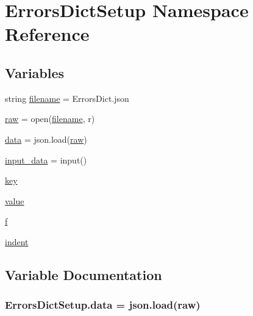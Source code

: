 \hypertarget{namespace_errors_dict_setup}{}\section{Errors\+Dict\+Setup Namespace Reference}
\label{namespace_errors_dict_setup}
\subsection*{Variables}
\begin{DoxyCompactItemize}
\item 
string \hyperlink{namespace_errors_dict_setup_a0c97c48fca0fdec3e730b9df1dbab9c7}{filename} = \textquotesingle{}Errors\+Dict.\+json\textquotesingle{}
\item 
\hyperlink{namespace_errors_dict_setup_a71f324cc110ab41d2a588f590fff7481}{raw} = open(\hyperlink{namespace_errors_dict_setup_a0c97c48fca0fdec3e730b9df1dbab9c7}{filename}, \textquotesingle{}r\textquotesingle{})
\item 
\hyperlink{namespace_errors_dict_setup_af570460846fb9f0c91abd308a095dcdc}{data} = json.\+load(\hyperlink{namespace_errors_dict_setup_a71f324cc110ab41d2a588f590fff7481}{raw})
\item 
\hyperlink{namespace_errors_dict_setup_a82a4de99ebada6605cb7ca0598ef411e}{input\+\_\+data} = input()
\item 
\hyperlink{namespace_errors_dict_setup_a09c268098d09ffb8e5504f30fa6d5dd9}{key}
\item 
\hyperlink{namespace_errors_dict_setup_a4436d6af623cbe45d37493afe4de9461}{value}
\item 
\hyperlink{namespace_errors_dict_setup_aadfab4e19ca2acd086062511d8ec75a8}{f}
\item 
\hyperlink{namespace_errors_dict_setup_a3c8f88b66a58f9c28e5d3bd66fa6191a}{indent}
\end{DoxyCompactItemize}


\subsection{Variable Documentation}
\subsubsection[{\texorpdfstring{data}{data}}]{\setlength{\rightskip}{0pt plus 5cm}Errors\+Dict\+Setup.\+data = json.\+load({\bf raw})}\hypertarget{namespace_errors_dict_setup_af570460846fb9f0c91abd308a095dcdc}{}\label{namespace_errors_dict_setup_af570460846fb9f0c91abd308a095dcdc}


